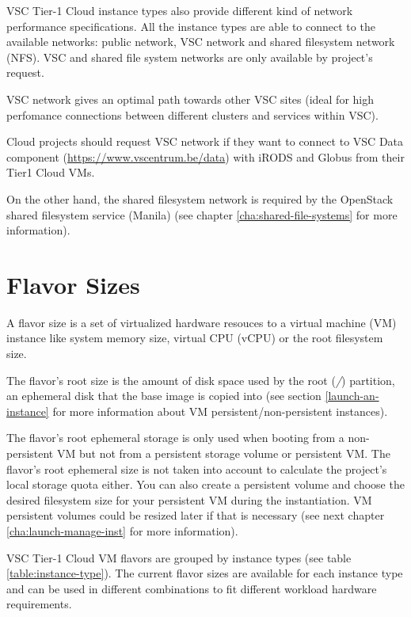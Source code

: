 VSC Tier-1 Cloud instance types also provide different kind of network
performance specifications. All the instance types are able to connect
to the available networks: public network, VSC network and shared filesystem
network (NFS). VSC and shared file system networks are only available
by project's request.

VSC network gives an optimal path towards other VSC sites (ideal for high
perfomance connections between different clusters and services within VSC).

 Cloud projects should request VSC network if they want to
connect to VSC Data component (\url{https://www.vscentrum.be/data}) with iRODS
and Globus from their Tier1 Cloud VMs.

On the other hand, the shared filesystem network is required by the OpenStack
shared filesystem service (Manila) (see chapter \ref{cha:shared-file-systems}
for more information).


\section{Flavor Sizes}\label{sec:flavor-sizes}
A flavor size is a set of virtualized hardware resouces to a virtual
machine (VM) instance like system memory size, virtual CPU (vCPU)
or the root filesystem size. 

The flavor's root size is the amount of disk space
used by the root (\emph{/}) partition, an ephemeral disk that the
base image is copied into (see section \ref{launch-an-instance} for
more information about VM persistent/non-persistent instances).

The flavor's root ephemeral storage is only used when booting from
a non-persistent VM but not from a persistent storage volume or
persistent VM.
The flavor's root ephemeral size is not taken into account to
calculate the project's local storage quota either. You can also
create a persistent volume and choose the desired filesystem size for
your persistent VM during the instantiation.
VM persistent volumes could be resized later if that is necessary
(see next chapter \ref{cha:launch-manage-inst} for more information).

VSC Tier-1 Cloud VM flavors are grouped by instance types
(see table \ref{table:instance-type}). The current flavor sizes are
available for each instance type and can be used in different
combinations to fit different workload hardware requirements.

